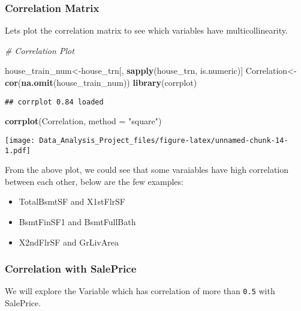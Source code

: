 \documentclass[]{article}
\newenvironment{Shaded}{\begin{snugshade}}{\end{snugshade}}
\newcommand{\KeywordTok}[1]{\textcolor[rgb]{0.13,0.29,0.53}{\textbf{#1}}}
\newcommand{\DataTypeTok}[1]{\textcolor[rgb]{0.13,0.29,0.53}{#1}}
\newcommand{\StringTok}[1]{\textcolor[rgb]{0.31,0.60,0.02}{#1}}
\newcommand{\CommentTok}[1]{\textcolor[rgb]{0.56,0.35,0.01}{\textit{#1}}}
\newcommand{\NormalTok}[1]{#1}
\providecommand{\tightlist}{%
  \setlength{\itemsep}{0pt}\setlength{\parskip}{0pt}}
\begin{document}
\subsubsection{Correlation Matrix}\label{correlation-matrix}

Lets plot the correlation matrix to see which variables have
multicollinearity.

\begin{Shaded}
\begin{Highlighting}[]
\CommentTok{# Correlation Plot}

\NormalTok{house_train_num<-house_trn[, }\KeywordTok{sapply}\NormalTok{(house_trn, is.numeric)]}
\NormalTok{Correlation<-}\KeywordTok{cor}\NormalTok{(}\KeywordTok{na.omit}\NormalTok{(house_train_num))}
\KeywordTok{library}\NormalTok{(corrplot)}
\end{Highlighting}
\end{Shaded}

\begin{verbatim}
## corrplot 0.84 loaded
\end{verbatim}

\begin{Shaded}
\begin{Highlighting}[]
\KeywordTok{corrplot}\NormalTok{(Correlation, }\DataTypeTok{method =} \StringTok{"square"}\NormalTok{)}
\end{Highlighting}
\end{Shaded}

\texttt{[image: Data\_Analysis\_Project\_files/figure-latex/unnamed-chunk-14-1.pdf]}

From the above plot, we could see that some varaiables have high
correlation between each other, below are the few examples:

\begin{itemize}
\tightlist
\item
  TotalBsmtSF and X1stFlrSF
\item
  BsmtFinSF1 and BsmtFullBath
\item
  X2ndFlrSF and GrLivArea
\end{itemize}

\subsubsection{Correlation with
SalePrice}\label{correlation-with-saleprice}

We will explore the Variable which has correlation of more than
\texttt{0.5} with SalePrice.
\end{document}
